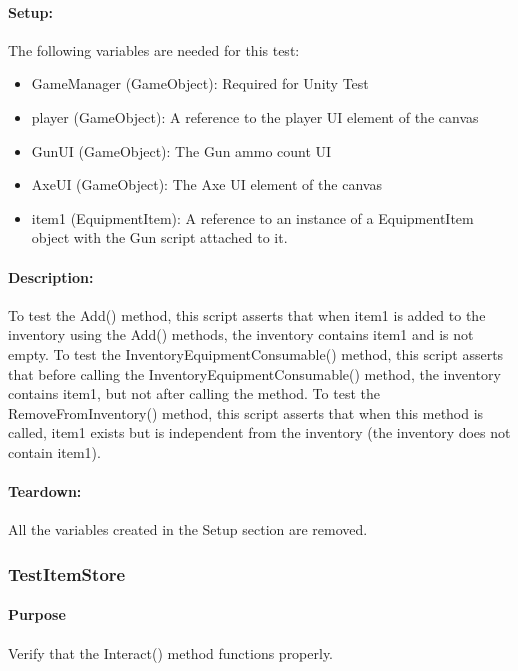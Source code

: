 \documentclass[12pt, titlepage]{article}
\begin{document}
\paragraph{Setup: } The following variables are needed for this test:
\begin{itemize}
	\item GameManager (GameObject): Required for Unity Test
	\item  player (GameObject): A reference to the player UI element of the canvas
	\item  GunUI (GameObject): The Gun ammo count UI
	\item AxeUI (GameObject): The Axe UI element of the canvas
	\item item1 (EquipmentItem): A reference to an instance of a EquipmentItem object with the Gun script attached to it.
	
\end{itemize}
\paragraph{Description: }
To test the Add() method, this script asserts that when item1 is added to the inventory using the Add() methods, the inventory contains item1 and is not empty.
\newline
To test the InventoryEquipmentConsumable() method, this script asserts that before calling the InventoryEquipmentConsumable() method, the inventory contains item1, but not after calling the method.
\newline
To test the RemoveFromInventory() method, this script asserts that when this method is called, item1 exists but is independent from the inventory (the inventory does not contain item1).

\paragraph{Teardown: } All the variables created in the Setup section are removed.

\subsubsection{Test\textunderscore ItemStore}

\paragraph{Purpose} Verify that the Interact() method functions properly.
\end{document}
